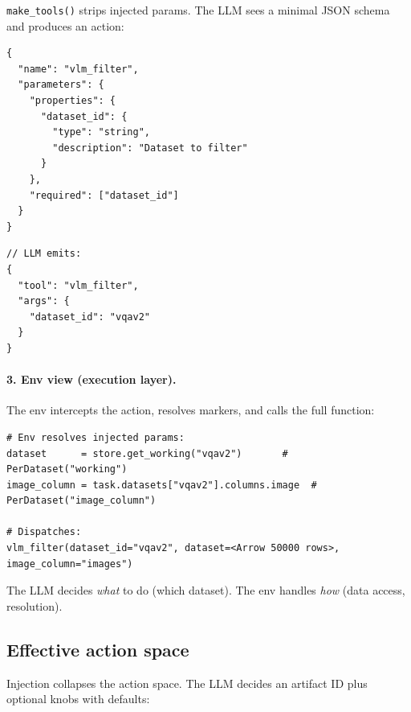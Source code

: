 \texttt{make\_tools()} strips injected params. The LLM sees a minimal JSON schema and produces an action:

\begin{minipage}[t]{0.48\linewidth}
\begin{verbatim}
{
  "name": "vlm_filter",
  "parameters": {
    "properties": {
      "dataset_id": {
        "type": "string",
        "description": "Dataset to filter"
      }
    },
    "required": ["dataset_id"]
  }
}
\end{verbatim}
\end{minipage}
\hfill
\begin{minipage}[t]{0.48\linewidth}
\begin{verbatim}
// LLM emits:
{
  "tool": "vlm_filter",
  "args": {
    "dataset_id": "vqav2"
  }
}
\end{verbatim}
\end{minipage}

\paragraph{3. Env view (execution layer).}

The env intercepts the action, resolves markers, and calls the full function:

\begin{verbatim}
# Env resolves injected params:
dataset      = store.get_working("vqav2")       # PerDataset("working")
image_column = task.datasets["vqav2"].columns.image  # PerDataset("image_column")

# Dispatches:
vlm_filter(dataset_id="vqav2", dataset=<Arrow 50000 rows>, image_column="images")
\end{verbatim}

\noindent The LLM decides \emph{what} to do (which dataset). The env handles \emph{how} (data access, resolution).


\subsection{Effective action space}
\label{sec:action-space}

Injection collapses the action space.
The LLM decides an artifact ID plus optional knobs with defaults:

